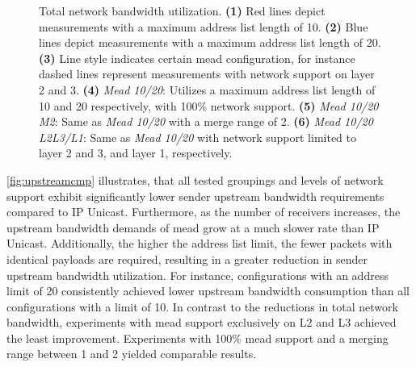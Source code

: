\begin{figure}
    \begin{center}
        
    \end{center}
    \caption[UC1 Live stream: Total network bandwidth utilization]{
        \nuci{} Total network bandwidth utilization.
        \textbf{(1)} Red lines depict measurements with a maximum address list length of 10.
        \textbf{(2)} Blue lines depict measurements with a maximum address list length of 20.
        \textbf{(3)} Line style indicates certain \gls{mead} configuration, for
            instance dashed lines represent measurements with network support
            on layer 2 and 3.
        \textbf{(4)} \textit{Mead 10/20}:
            Utilizes a maximum address list length of 10 and 20 respectively,
            with 100\% network support.
        \textbf{(5)} \textit{Mead 10/20 M2}:
            Same as \textit{Mead 10/20} with a merge range of 2.
        \textbf{(6)} \textit{Mead 10/20 L2L3/L1}:
            Same as \textit{Mead 10/20} with network support limited to layer 2 and 3,
            and layer 1, respectively.
        }
    \label{fig:netloadcmp}
\end{figure}

\autoref{fig:upstreamcmp} illustrates, that all tested groupings and levels of
    network support exhibit significantly lower sender upstream bandwidth
    requirements compared to IP Unicast.
Furthermore, as the number of receivers increases, the upstream bandwidth
    demands of \gls{mead} grow at a much slower rate than IP Unicast.
Additionally, the higher the address list limit, the fewer packets with
    identical payloads are required, resulting in a greater reduction in sender
    upstream bandwidth utilization.
For instance, configurations with an address limit of 20 consistently
    achieved lower upstream bandwidth consumption than all configurations with
    a limit of 10.
In contrast to the reductions in total network bandwidth, experiments with
    \gls{mead} support exclusively on L2 and L3 achieved the least improvement.
Experiments with 100\% \gls{mead} support and a merging range between 1 and 2
    yielded comparable results.


